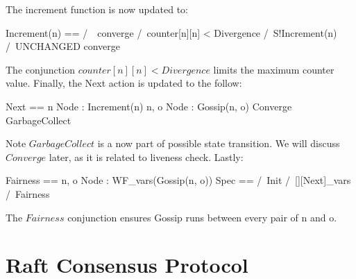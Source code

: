 \documentclass{report}
\begin{document}
The increment function is now updated to: 
\begin{tla}
    Increment(n) ==
        /\ ~converge
        /\ counter[n][n] < Divergence
        /\ S!Increment(n)
        /\ UNCHANGED converge
\end{tla}
\begin{tlatex}
%
%
%
%
%
\end{tlatex}

The conjunction $counter[n][n] < Divergence$ limits the maximum counter value.
Finally, the Next action is updated to the follow:

\begin{tla}
    Next ==
        \/ \E n \in Node : Increment(n)
        \/ \E n, o \in Node : Gossip(n, o)
        \/ Converge
        \/ GarbageCollect
\end{tla}
\begin{tlatex}
%
%
%
%
%
\end{tlatex}

Note $GarbageCollect$ is a now part of possible state transition. We will
discuss $Converge$ later, as it is related to liveness check. Lastly: 

\begin{tla}
    Fairness == \A n, o \in Node : WF_vars(Gossip(n, o))
    Spec ==
        /\ Init
        /\ [][Next]_vars
        /\ Fairness
\end{tla}
\begin{tlatex}
%
%
%
%
\end{tlatex}

The $Fairness$ conjunction ensures Gossip runs between every pair of n and o. 

\chapter{Raft Consensus Protocol}
\end{document}

